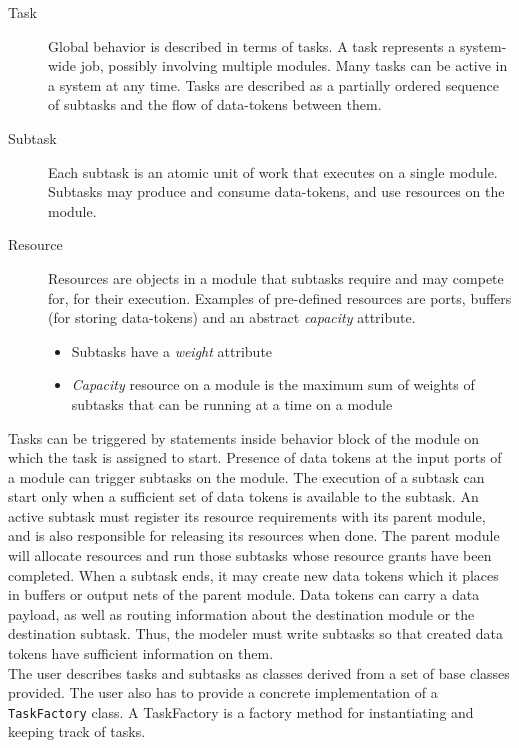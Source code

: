 	\begin{description}
	\item[Task] Global behavior is described in terms of tasks. A task
	represents a system-wide job, possibly involving multiple modules.
	Many tasks can be active in a system at any time. Tasks are described as 
	a partially ordered sequence of subtasks and the flow of data-tokens between them.

	\item[Subtask] Each subtask is an atomic unit of work that executes on a single
	module. Subtasks may produce and consume data-tokens, and use resources on the module.

	\item[Resource] Resources are objects in a module that subtasks require and may compete for,
	for their execution. Examples of pre-defined resources are ports, buffers (for storing data-tokens)
	and an abstract \emph{capacity} attribute.
	\begin{itemize}
		\item Subtasks have a \emph{weight} attribute
		\item \emph{Capacity} resource on a module is the maximum sum of weights
		of subtasks that can be running at a time on a module
	\end{itemize}
	\end{description}

	Tasks can be triggered by statements inside behavior block of the
	module on which the task is assigned to start. Presence of data tokens
	at the input ports of a module can trigger subtasks on the module.  The
	execution of a subtask can start only when a sufficient set of data
	tokens is available to the subtask.  An active subtask must register
	its resource requirements with its parent module, and is also
	responsible for releasing its resources when done.  The parent module
	will allocate resources and run those subtasks whose resource grants
	have been completed.  When a subtask ends, it may create new data
	tokens which it places in buffers or output nets of the parent module.
	Data tokens can carry a data payload, as well as routing information
	about the destination module or the destination subtask.  Thus, the
	modeler must write subtasks so that created data tokens have sufficient
	information on them.\\

	

	The user describes tasks and subtasks as classes derived from a set of
	base classes provided. The user also has to provide a concrete
	implementation of a \texttt{TaskFactory} class.  A TaskFactory is a
	factory method for instantiating and keeping track of tasks.\\

